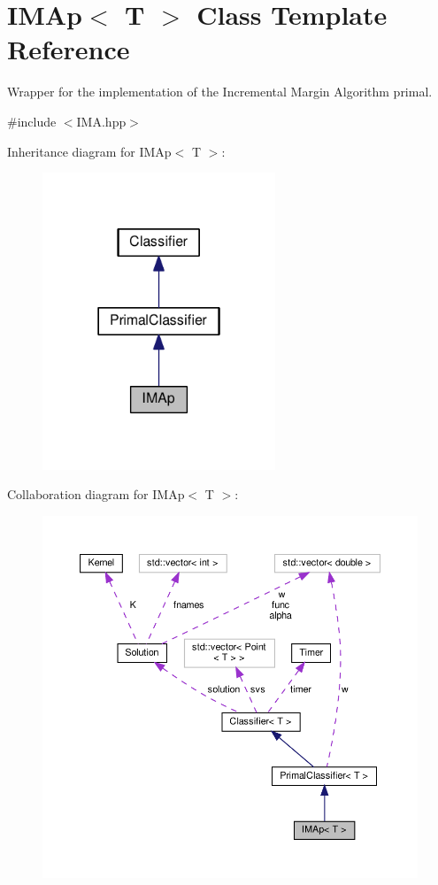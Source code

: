\hypertarget{class_i_m_ap}{}\section{I\+M\+Ap$<$ T $>$ Class Template Reference}
\label{class_i_m_ap}


Wrapper for the implementation of the Incremental Margin Algorithm primal.  




{\ttfamily \#include $<$I\+M\+A.\+hpp$>$}



Inheritance diagram for I\+M\+Ap$<$ T $>$\+:
\nopagebreak
\begin{figure}[H]
\begin{center}
\leavevmode
\includegraphics[width=197pt]{class_i_m_ap__inherit__graph}
\end{center}
\end{figure}


Collaboration diagram for I\+M\+Ap$<$ T $>$\+:
\nopagebreak
\begin{figure}[H]
\begin{center}
\leavevmode
\includegraphics[width=350pt]{class_i_m_ap__coll__graph}
\end{center}
\end{figure}

